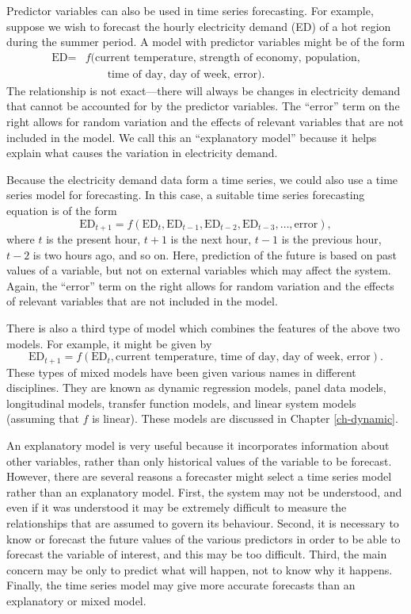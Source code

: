 \documentclass[]{book}
\begin{document}
Predictor variables can also be used in time series forecasting. For example, suppose we wish to forecast the hourly electricity demand (ED) of a hot region during the summer period. A model with predictor variables might be of the form
\begin{align*}
  \text{ED} = & f(\text{current temperature, strength of economy, population,}\\
 &  \qquad\text{time of day, day of week, error}).
\end{align*}
The relationship is not exact---there will always be changes in electricity demand that cannot be accounted for by the predictor variables. The ``error'' term on the right allows for random variation and the effects of relevant variables that are not included in the model. We call this an ``explanatory model'' because it helps explain what causes the variation in electricity demand.

Because the electricity demand data form a time series, we could also use a time series model for forecasting. In this case, a suitable time series forecasting equation is of the form
\[
  \text{ED}_{t+1} = f(\text{ED}_{t}, \text{ED}_{t-1}, \text{ED}_{t-2}, \text{ED}_{t-3},\dots, \text{error}),
\]
where \(t\) is the present hour, \(t+1\) is the next hour, \(t-1\) is the previous hour, \(t-2\) is two hours ago, and so on. Here, prediction of the future is based on past values of a variable, but not on external variables which may affect the system. Again, the ``error'' term on the right allows for random variation and the effects of relevant variables that are not included in the model.

There is also a third type of model which combines the features of the above two models. For example, it might be given by
\[
 \text{ED}_{t+1} = f(\text{ED}_{t}, \text{current temperature, time of day, day of week, error}).
\]
These types of mixed models have been given various names in different disciplines. They are known as dynamic regression models, panel data models, longitudinal models, transfer function models, and linear system models (assuming that \(f\) is linear). These models are discussed in Chapter \ref{ch-dynamic}.

An explanatory model is very useful because it incorporates information about other variables, rather than only historical values of the variable to be forecast. However, there are several reasons a forecaster might select a time series model rather than an explanatory model. First, the system may not be understood, and even if it was understood it may be extremely difficult to measure the relationships that are assumed to govern its behaviour. Second, it is necessary to know or forecast the future values of the various predictors in order to be able to forecast the variable of interest, and this may be too difficult. Third, the main concern may be only to predict what will happen, not to know why it happens. Finally, the time series model may give more accurate forecasts than an explanatory or mixed model.
\end{document}
